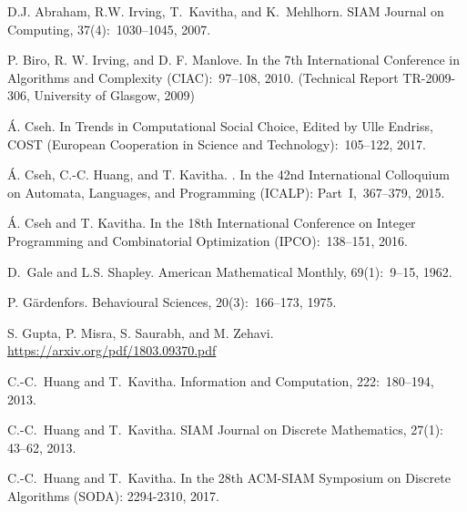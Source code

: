 \documentclass{llncs}
\begin{document}
 
\begin{thebibliography}{22}

D.J. Abraham, R.W. Irving, T.~Kavitha, and K.~Mehlhorn.
\newblock SIAM Journal on Computing, 37(4):~1030--1045, 2007.

P. Biro, R. W. Irving, and D. F. Manlove.
\newblock In the 7th International Conference in Algorithms and Complexity (CIAC):~97--108, 2010.
(Technical Report TR-2009-306, University of Glasgow, 2009)

\'{A}. Cseh.
\newblock In Trends in Computational Social Choice, Edited by Ulle Endriss,
COST (European Cooperation in Science and Technology):~105--122, 2017.

\'{A}. Cseh, C.-C. Huang, and T. Kavitha.
. 
\newblock In the 42nd International Colloquium on Automata, Languages, and Programming (ICALP): Part~I,~367--379, 2015.

\'{A}. Cseh and T. Kavitha.
\newblock In the 18th International Conference on Integer Programming and Combinatorial Optimization (IPCO):~138--151, 2016. 

D.~Gale and L.S. Shapley.
\newblock American Mathematical Monthly, 69(1):~9--15, 1962.

P. G\"ardenfors.
\newblock Behavioural Sciences, 20(3):~166--173, 1975.

S. Gupta, P. Misra, S. Saurabh, and M. Zehavi.
\newblock \url{https://arxiv.org/pdf/1803.09370.pdf}

C.-C.~Huang and T.~Kavitha.
\newblock Information and Computation, 222:~180--194, 2013.

C.-C.~Huang and T.~Kavitha.
\newblock SIAM Journal on Discrete Mathematics, 27(1): 43--62, 2013.

C.-C.~Huang and T.~Kavitha.
\newblock In the 28th ACM-SIAM Symposium on Discrete Algorithms (SODA): 2294-2310, 2017.


\end{thebibliography}
\end{document}
